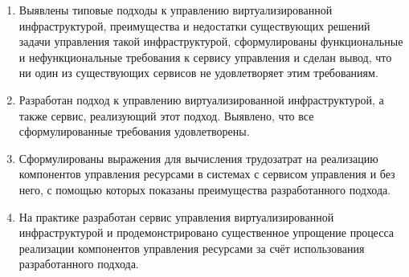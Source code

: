 \begin{enumerate}
    \item Выявлены типовые подходы к управлению виртуализированной инфраструктурой, преимущества и недостатки существующих решений задачи управления такой инфраструктурой, сформулированы функциональные и нефункциональные требования к сервису управления и сделан вывод, что ни один из существующих сервисов не удовлетворяет этим требованиям.

    \item Разработан подход к управлению виртуализированной инфраструктурой, а также сервис, реализующий этот подход. Выявлено, что все сформулированные требования удовлетворены.

    \item Сформулированы выражения для вычисления трудозатрат на реализацию компонентов управления ресурсами в системах с сервисом управления и без него, с помощью которых показаны преимущества разработанного подхода. 

    \item На практике разработан сервис управления виртуализированной инфраструктурой и продемонстрировано существенное упрощение процесса реализации компонентов управления ресурсами за счёт использования разработанного подхода.
\end{enumerate}
